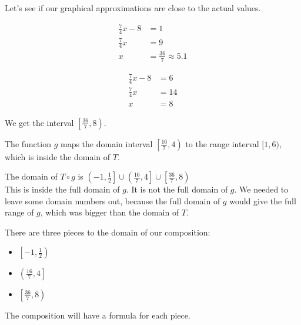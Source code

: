 \documentclass{ximera}
\begin{document}
Let's see if our graphical approximations are close to the actual values.


\begin{align*}
\frac{7}{4}x - 8 & = 1 \\
\frac{7}{4}x     & =  9  \\
x                & =  \frac{36}{7} \approx 5.1
\end{align*}


\begin{align*}
\frac{7}{4}x - 8 & = 6 \\
\frac{7}{4}x     & = 14  \\
x                & = 8
\end{align*}





We get the interval $\left[ \frac{36}{7}, 8 \right)$.


The function $g$ maps the domain interval $\left[ \frac{16}{7}, 4 \right)$ to the range interval $[1,6)$, which is inside the domain of $T$.







The domain of $T \circ g$ is $\left( -1, \frac{1}{2} \right] \cup \left( \frac{16}{7}, 4 \right] \cup \left[ \frac{36}{7}, 8 \right)$ \\


This is inside the full domain of $g$. It is not the full domain of $g$.  We needed to leave some domain numbers out, because the full domain of $g$ would give the full range of $g$, which was bigger than the domain of $T$.



There are three pieces to the domain of our composition: 


\begin{itemize}
  \item $\left[ -1, \frac{1}{2} \right)$
  \item $\left( \frac{16}{7}, 4 \right]$
  \item $\left[ \frac{36}{7}, 8 \right)$
\end{itemize}



The composition will have a formula for each piece.
\end{document}
